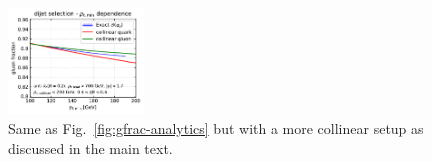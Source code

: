 \documentclass[a4paper,11pt]{article}
\begin{document}
\begin{figure}
   \includegraphics[page=3, width=0.32\textwidth]{born-fractions-smallr.pdf} 
    \caption{Same as Fig.~\ref{fig:gfrac-analytics} but with a more collinear setup as discussed in the main text.} 
    \label{fig:gfrac-analytics-smallR}
\end{figure}



\end{document}
